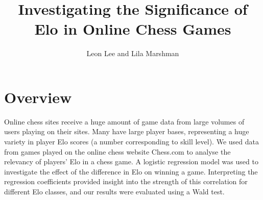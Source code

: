 \documentclass[10pt,a4paper]{article}
\title{Investigating the Significance of Elo in Online Chess Games}
\author{Leon Lee and Lila Marshman}
\begin{document}
\maketitle

\section{Overview}
Online chess sites receive a huge amount of game data from large volumes of users playing on their sites. Many have large player bases, representing a huge variety in player Elo scores (a number corresponding to skill level). We used data from games played on the online chess website Chess.com to analyse the relevancy of players' Elo in a chess game. A logistic regression model was used to investigate the effect of the difference in Elo on winning a game. Interpreting the regression coefficients provided insight into the strength of this correlation for different Elo classes, and our results were evaluated using a Wald test. \newline
\end{document}
